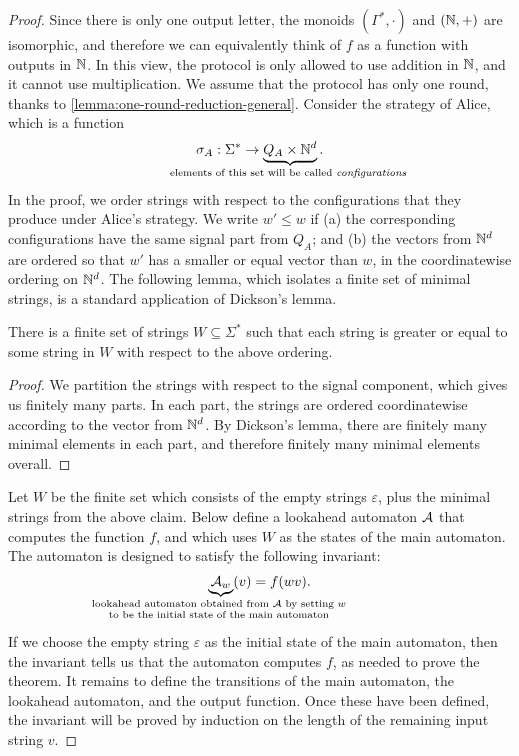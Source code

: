\begin{proof}
Since there is only one output letter, the monoids $(\Gamma^*,\cdot)$ and $({\mathbb N},+)$ are isomorphic, and therefore we can equivalently think of $f$ as a function with outputs in ${\mathbb N}$. In this view, the protocol is only allowed to use addition in ${\mathbb N}$, and it cannot use multiplication. 
We assume that the protocol has only one round, thanks to \cref{lemma:one-round-reduction-general}. Consider the strategy of Alice, which is a function 
\begin{align*}
\sigma_A : \Sigma^* \to \myunderbrace{Q_A \times \Nat^d}{elements of this set will be called \emph{configurations}}.
\end{align*}
In the proof, we order strings with respect to the configurations that they produce under Alice's strategy. We write $w' \le w$ if (a) the corresponding configurations have the same signal part from $Q_A$; and (b) the vectors from ${\mathbb N}^d$ are ordered so that  $w'$ has a smaller or equal vector than $w$, in the coordinatewise ordering on ${\mathbb N}^d$. The following lemma, which isolates a finite set of minimal strings, is a standard application of Dickson's lemma.

\begin{lemma}\label{lem:minimal-configurations}
  There is a finite set of strings $W \subseteq \Sigma^*$ such that each string is greater or equal to some string in $W$ with respect to the above ordering.
\end{lemma}
\begin{proof}
  We partition the strings with respect to the signal component, which gives us finitely many parts. In each part, the strings are ordered coordinatewise according to the vector from ${\mathbb N}^d$. By Dickson's lemma, there are finitely many minimal elements in each part, and therefore finitely many minimal elements overall.
\end{proof}

Let $W$ be the finite set which consists of the empty strings $\varepsilon$, plus the minimal strings from the above claim. Below define a lookahead automaton ${\mathcal A}$ that computes the function $f$, and which uses $W$ as the states of the main automaton. The automaton is designed to satisfy the following invariant:
\begin{align*}
\myunderbrace{\Aa_w}{lookahead automaton obtained from $\Aa$ by setting $w$ \\ to be the initial state of the main automaton}(v){} = f(wv).
\end{align*}
If we choose the empty string $\varepsilon$ as the initial state of the main automaton, then the invariant tells us that the automaton computes $f$, as needed to prove the theorem. It remains to define the transitions of the main automaton, the lookahead automaton, and the output function. Once these have been defined, the invariant will be proved by induction on the length of the remaining input string $v$.


\end{proof}
